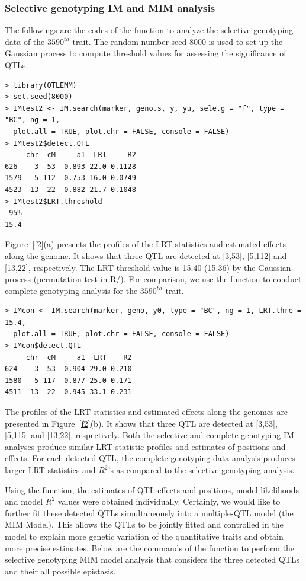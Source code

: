 \subsubsection{Selective genotyping IM and MIM analysis} \label{3.3.2}

The followings are the codes of the  function to analyze the selective genotyping data of the $3590^{th}$ trait. The random number seed 8000 is used to set up the Gaussian process to compute threshold values for assessing the significance of QTLs.

\begin{verbatim}
> library(QTLEMM) 
> set.seed(8000)
> IMtest2 <- IM.search(marker, geno.s, y, yu, sele.g = "f", type = "BC", ng = 1, 
  plot.all = TRUE, plot.chr = FALSE, console = FALSE)
> IMtest2$detect.QTL
     chr  cM     a1  LRT     R2
626    3  53  0.893 22.0 0.1128
1579   5 112  0.753 16.0 0.0749
4523  13  22 -0.882 21.7 0.1048
> IMtest2$LRT.threshold
 95% 
15.4 
\end{verbatim}

\noindent Figure~\ref{f2}(a) presents the profiles of the LRT statistics and estimated effects along the genome. It shows that three QTL are detected at [3,53], [5,112] and [13,22], respectively. The LRT threshold value is 15.40 (15.36) by the Gaussian process (permutation test in R/). For comparison, we  use the  function to conduct complete genotyping analysis for the $3590^{th}$ trait.

\begin{verbatim}
> IMcon <- IM.search(marker, geno, y0, type = "BC", ng = 1, LRT.thre = 15.4,
  plot.all = TRUE, plot.chr = FALSE, console = FALSE)
> IMcon$detect.QTL
     chr  cM     a1  LRT    R2
624    3  53  0.904 29.0 0.210
1580   5 117  0.877 25.0 0.171
4511  13  22 -0.945 33.1 0.231
\end{verbatim}

\noindent The profiles of the LRT statistics and estimated effects along the genomes are presented in Figure~\ref{f2}(b). It shows that three QTL are detected at [3,53], [5,115] and [13,22], respectively. Both the selective and complete genotyping IM analyses produce similar LRT statistic profiles and estimates of positions and effects. For each detected QTL, the complete genotyping data analysis produces larger LRT statistics and $R^{2}$’s as compared to the selective genotyping analysis.

Using the  function, the estimates of QTL effects and positions, model likelihoods and model $R^{2}$ values were obtained individually. Certainly, we would like to further fit these detected QTLs simultaneously into a multiple-QTL model (the MIM Model). This allows the QTLs to be jointly fitted and controlled in the model to explain more genetic variation of the quantitative traits and obtain more precise estimates. Below are the commands of the  function to perform the selective genotyping MIM model analysis that considers the three detected QTLs and their all possible epistasis.

